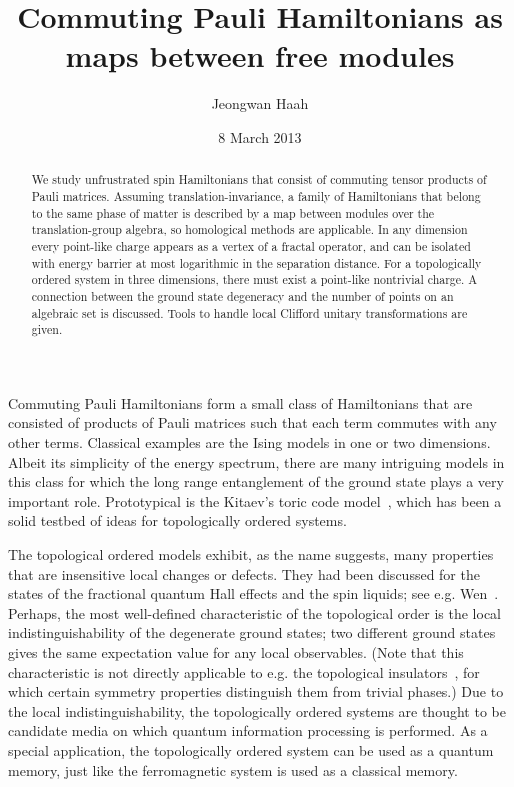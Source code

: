 \documentclass[letterpaper,12pt]{amsart}
\theoremstyle{definition} \newtheorem{defn}{Definition}
\theoremstyle{definition} \newtheorem{rem}{Remark}
\theoremstyle{definition} \newtheorem{example}{Example}
\begin{document}
\title{Commuting Pauli Hamiltonians as maps between free modules}
\author{Jeongwan Haah}
\address{Institute for Quantum Information and Matter, California Institute of Technology, Pasadena, California}
\date{8 March 2013}
\begin{abstract}
We study unfrustrated spin Hamiltonians 
that consist of commuting tensor products of Pauli matrices.
Assuming translation-invariance,
a family of Hamiltonians that belong to the same phase of matter
is described by a map between modules over the translation-group algebra,
so homological methods are applicable.
In any dimension every point-like charge
appears as a vertex of a fractal operator, and
can be isolated with energy barrier at most logarithmic in the separation distance.
For a topologically ordered system in three dimensions,
there must exist a point-like nontrivial charge.
A connection between the ground state degeneracy and the number of points on
an algebraic set is discussed.
Tools to handle local Clifford unitary transformations are given.
\end{abstract}
\maketitle
{\small \tableofcontents}



Commuting Pauli Hamiltonians form a small class of Hamiltonians
that are consisted of products of Pauli matrices such that
each term commutes with any other terms.
Classical examples are the Ising models in one or two dimensions.
Albeit its simplicity of the energy spectrum,
there are many intriguing models in this class
for which the long range entanglement of the ground state plays a very important role.
Prototypical is the Kitaev's toric code model~\cite{Kitaev2003Fault-tolerant},
which has been a solid testbed of ideas for topologically ordered systems.

The topological ordered models exhibit, as the name suggests, many properties
that are insensitive local changes or defects.
They had been discussed for the states of
the fractional quantum Hall effects and the spin liquids;
see e.g. Wen~\cite{Wen1991SpinLiquid}.
Perhaps, the most well-defined characteristic of the topological order
is the local indistinguishability of the degenerate ground states;
two different ground states gives the same expectation 
value for any local observables.
(Note that this characteristic is not directly applicable to
e.g. the topological insulators~\cite{HasanKane2010TIReview},
for which certain symmetry properties distinguish them from trivial phases.)
Due to the local indistinguishability,
the topologically ordered systems are thought
to be candidate media
on which quantum information processing is performed.
As a special application, the topologically ordered system can be used as
a quantum memory, just like the ferromagnetic system is used as a classical memory.
\end{document}
